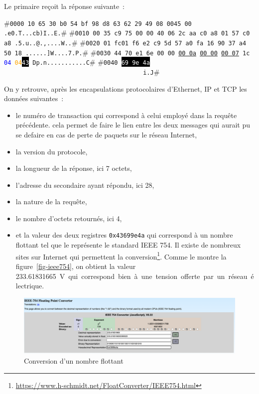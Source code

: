 \documentclass[11pt,fleqn]{book} %
\begin{document}
Le primaire reçoit la réponse suivante~:

\begin{termc}[backgroundcolor=\color{backcolour}, escapechar=#]
#\texttt{\small{0000  \colorbox{purple!50}{10 65 30 b0 54 bf 98 d8 63 62 29 49 08 00}\colorbox{blue!30}{45 00}   .e0.T...cb)I..E.}}# 
#\texttt{\small{0010  \colorbox{blue!30}{00 35 c9 75 00 00 40 06 2c aa c0 a8 01 57 c0 a8}   .5.u..@.,....W..}}# 
#\texttt{\small{0020  \colorbox{blue!30}{01 fc}\colorbox{red!30}{01 f6 e2 c9 5d 57 a0 fa 16 90 37 a4 50 18}   ......]W....7.P.}}# 
#\texttt{\small{0030  \colorbox{red!30}{44 70 e1 6e 00 00} \ul{00 0a} \ul{00 00} \ul{00 07} 1c \textcolor{blue}{04} \textcolor{orange}{04}\colorbox{black}{\textcolor{white}{43}}   Dp.n...........C}}# 
#\texttt{\small{0040  \colorbox{black}{\textcolor{white}{69 9e 4a}} \ \ \ \ \ \ \ \ \ \ \ \ \ \ \ \ \ \ \ \ \ \ \ \ \ \ \ \ \ \ \ \ \ \ \ \ \ \ \ i.J}}# 
                           
\end{termc}

On y retrouve, après les encapsulations protocolaires d'Ethernet, IP et TCP les données suivantes~:
\begin{itemize}
    \item le numéro de transaction qui correspond à celui employé dans la requête précédente. cela permet de faire le lien entre les deux messages qui aurait pu se defaire en cas de perte de paquets sur le réseau Internet,
    \item la version du protocole,
    \item la longueur de la réponse, ici 7 octets,
    \item l'adresse du secondaire ayant répondu, ici 28,
    \item la nature de la requête,
    \item le nombre d'octets retournés, ici 4,
    \item et la valeur des deux registres \texttt{0x43699e4a} qui correspond à un nombre flottant tel que le représente le standard IEEE 754. Il existe de nombreux sites sur Internet qui permettent la conversion\footnote{\url{https://www.h-schmidt.net/FloatConverter/IEEE754.html}}. Comme le montre la figure~\vref{fig-ieee754}, on obtient la valeur \SI{233.61831665}\volt qui correspond bien à une tension offerte par un réseau électrique.
\end{itemize}

  \begin{figure}[tbp]
\centerline{\includegraphics[width=1\columnwidth]{Pictures/IEEE754.png}}
\caption{Conversion d'un nombre flottant}
\label{fig-ieee754}
\end{figure}
\end{document}
